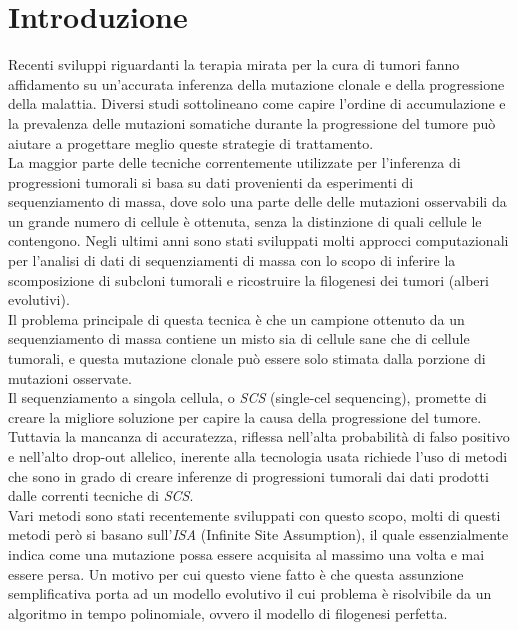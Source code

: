 \documentclass{report}
\begin{document}
{\pagestyle{plain}
  \tableofcontents
  \cleardoublepage}

\chapter{Introduzione}

  Recenti sviluppi riguardanti la terapia mirata per la cura di tumori fanno affidamento su un'accurata inferenza della mutazione clonale e della progressione della malattia.
  Diversi studi sottolineano come capire l'ordine di accumulazione e la prevalenza delle mutazioni somatiche durante la progressione del tumore può aiutare a progettare meglio queste strategie di trattamento.\\
  La maggior parte delle tecniche correntemente utilizzate per l'inferenza di progressioni tumorali si basa su dati provenienti da esperimenti di sequenziamento di massa, dove solo una parte delle delle mutazioni osservabili da un grande numero di cellule è ottenuta, senza la distinzione di quali cellule le contengono.
  Negli ultimi anni sono stati sviluppati molti approcci computazionali per l'analisi di dati di sequenziamenti di massa con lo scopo di inferire la scomposizione di subcloni tumorali e ricostruire la filogenesi dei tumori (alberi evolutivi).\\
  Il problema principale di questa tecnica è che un campione ottenuto da un sequenziamento di massa contiene un misto sia di cellule sane che di cellule tumorali, e questa mutazione clonale può essere solo stimata dalla porzione di mutazioni osservate.\\
  Il sequenziamento a singola cellula, o \emph{SCS} (single-cel sequencing), promette di creare la migliore soluzione per capire la causa della progressione del tumore.
  Tuttavia la mancanza di accuratezza, riflessa nell'alta probabilità di falso positivo e nell'alto drop-out allelico, inerente alla tecnologia usata richiede l'uso di metodi che sono in grado di creare inferenze di progressioni tumorali dai dati prodotti dalle correnti tecniche di \emph{SCS}.\\
  Vari metodi sono stati recentemente sviluppati con questo scopo, molti di questi metodi però si basano sull'\emph{ISA} (Infinite Site Assumption), il quale essenzialmente indica come una mutazione possa essere acquisita al massimo una volta e mai essere persa. Un motivo per cui questo viene fatto è che questa assunzione semplificativa porta ad un modello evolutivo il cui problema è risolvibile da un algoritmo in tempo polinomiale, ovvero il modello di filogenesi perfetta.\\
\end{document}
